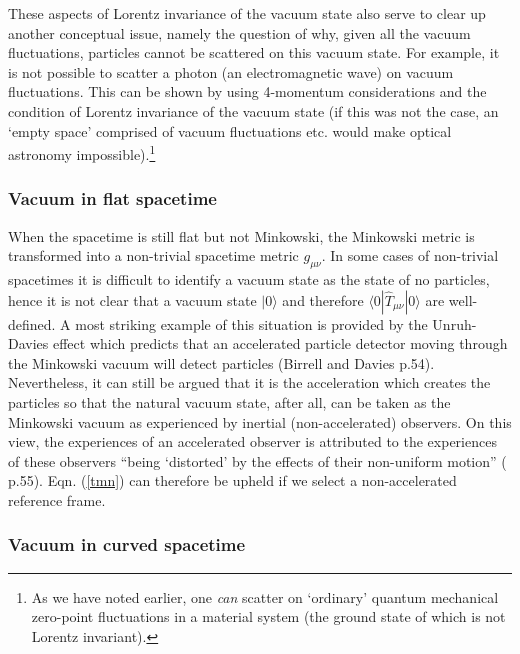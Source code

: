 \documentclass[12pt]{article}
\def\sss{\subsubsection}
\begin{document}
These aspects of Lorentz invariance of the vacuum state also serve to
clear up another conceptual issue, namely the question of why, given
all the vacuum fluctuations, particles 
cannot be scattered on this vacuum state. For example, it is not 
possible to scatter a photon (an electromagnetic
wave) on vacuum fluctuations. This can be shown by using 4-momentum
considerations and the condition of Lorentz invariance of the
vacuum state (if this was not the case, an `empty space' comprised
of vacuum fluctuations etc. would make optical astronomy
impossible).\footnote{As we have noted earlier, one {\em can} scatter on
`ordinary' quantum mechanical zero-point fluctuations in a material 
system (the ground state of which is not Lorentz invariant).} 
 

\sss{Vacuum in flat spacetime}

When the spacetime is still flat but not Minkowski, the Minkowski
metric is transformed into a non-trivial spacetime metric
$g_{\mu\nu}$. In some cases of non-trivial spacetimes it is
difficult to identify a vacuum state as the state of no particles,
hence it is not clear that a vacuum state $|0 \rangle $ and therefore
$\langle 0|\hat{T}_{\mu\nu}|0 \rangle $ are well-defined. A most striking example
of this situation is provided by the Unruh-Davies effect which
predicts that an accelerated particle detector moving through the
Minkowski vacuum will detect particles (Birrell and Davies
\cite{birrell82} p.54). Nevertheless, it can still be argued that
it is the acceleration which creates the particles so that the
natural vacuum state, after all, can be taken as the Minkowski
vacuum as experienced by inertial (non-accelerated) observers. On
this view, the experiences of an accelerated observer is
attributed to the experiences of these observers ``being
`distorted' by the effects of their non-uniform motion''
(\cite{birrell82} p.55). Eqn. (\ref{tmn}) can therefore be upheld
if we select a non-accelerated reference frame. 

\sss{Vacuum in curved spacetime}
\end{document}
